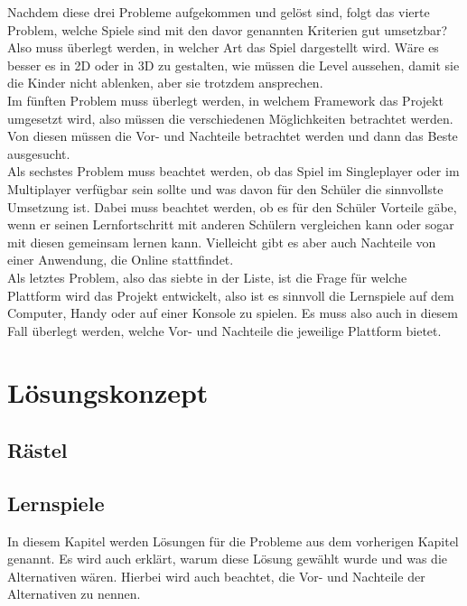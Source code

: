 Nachdem diese drei Probleme aufgekommen und gelöst sind, folgt das vierte Problem, welche Spiele sind mit den davor genannten Kriterien gut umsetzbar? Also muss überlegt werden, in welcher Art das Spiel dargestellt wird. Wäre es besser es in 2D oder in 3D zu gestalten, wie müssen die Level aussehen, damit sie die Kinder nicht ablenken, aber sie trotzdem ansprechen.
\\

Im fünften Problem muss überlegt werden, in welchem Framework das Projekt umgesetzt wird, also müssen die verschiedenen Möglichkeiten betrachtet werden. Von diesen müssen die Vor- und Nachteile betrachtet werden und dann das Beste ausgesucht. 
\\

Als sechstes Problem muss beachtet werden, ob das Spiel im Singleplayer oder im Multiplayer verfügbar sein sollte und was davon für den Schüler die sinnvollste Umsetzung ist. Dabei muss beachtet werden, ob es für den Schüler Vorteile gäbe, wenn er seinen Lernfortschritt mit anderen Schülern vergleichen kann oder sogar mit diesen gemeinsam lernen kann. Vielleicht gibt es aber auch Nachteile von einer Anwendung, die Online stattfindet.
\\

Als letztes Problem, also das siebte in der Liste, ist die Frage für welche Plattform wird das Projekt entwickelt, also ist es sinnvoll die Lernspiele auf dem Computer, Handy oder auf einer Konsole zu spielen. Es muss also auch in diesem Fall überlegt werden, welche Vor- und Nachteile die jeweilige Plattform bietet.

\chapter{Lösungskonzept}
\label{cha:loesungskonzept}

\section{Rästel}

\section{Lernspiele}

In diesem Kapitel werden Lösungen für die Probleme aus dem vorherigen Kapitel genannt. Es wird auch erklärt, warum diese Lösung gewählt wurde und was die Alternativen wären. Hierbei wird auch beachtet, die Vor- und Nachteile der Alternativen zu nennen. 
\\

